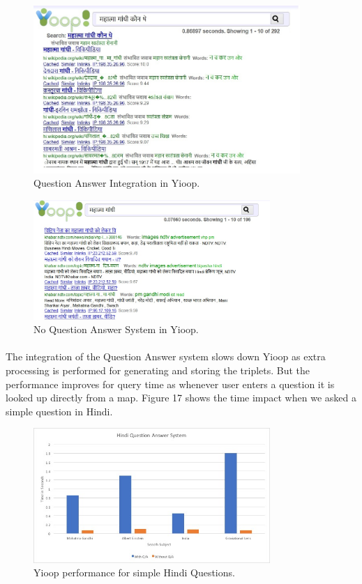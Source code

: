 \begin{figure}[htb]
\centering
\includegraphics[width=0.9\textwidth]{images/QA_IntegratedInYioop.jpg}
\caption{Question Answer Integration in Yioop.} 
\label{fig:QA_IntegratedInYioop}
\end{figure}
\break

\begin{figure}[htb]
\centering
\includegraphics[width=0.8\textwidth]{images/Yioop_NoQA.jpg}
\caption{No Question Answer System in Yioop.} 
\label{fig:Yioop_NoQA}
\end{figure}

\paragraph{}
The integration of the Question Answer system slows down Yioop as extra processing is performed for generating and storing the triplets. But the performance improves for query time as whenever user enters a question it is looked up directly from a map. Figure 17 shows the time impact when we asked a simple question in Hindi.

\begin{figure}[htb]
\centering
\includegraphics[width=0.8\textwidth]{images/QA_performance1.jpg}
\caption{Yioop performance for simple Hindi Questions.} 
\label{fig:QA_performance1}
\end{figure}

